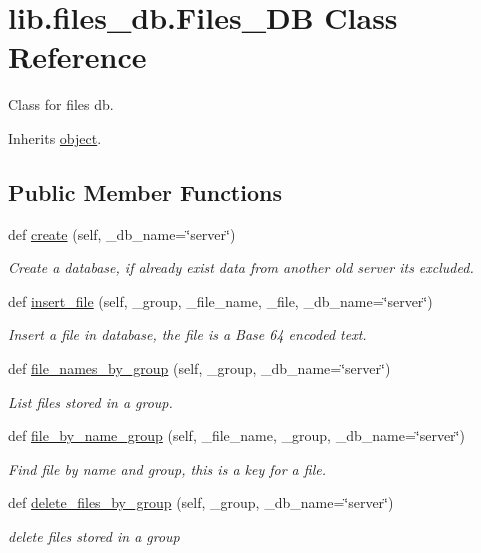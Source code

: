 \hypertarget{classlib_1_1files__db_1_1_files___d_b}{}\section{lib.\+files\+\_\+db.\+Files\+\_\+\+DB Class Reference}
\label{classlib_1_1files__db_1_1_files___d_b}


Class for files db.  




Inherits \hyperlink{classobject}{object}.

\subsection*{Public Member Functions}
\begin{DoxyCompactItemize}
\item 
def \hyperlink{classlib_1_1files__db_1_1_files___d_b_a2ed93dcb4dac5e59389ee16c1c8e5ebb}{create} (self, \+\_\+db\+\_\+name=\char`\"{}server\char`\"{})
\begin{DoxyCompactList}\small\item\em Create a database, if already exist data from another old server it\textquotesingle{}s excluded. \end{DoxyCompactList}\item 
def \hyperlink{classlib_1_1files__db_1_1_files___d_b_ac61ae182f614bd984fd1c467c09ef1b6}{insert\+\_\+file} (self, \+\_\+group, \+\_\+file\+\_\+name, \+\_\+file, \+\_\+db\+\_\+name=\char`\"{}server\char`\"{})
\begin{DoxyCompactList}\small\item\em Insert a file in database, the file is a Base 64 encoded text. \end{DoxyCompactList}\item 
def \hyperlink{classlib_1_1files__db_1_1_files___d_b_a8e3fdddca49d9b01d948e5d396807a81}{file\+\_\+names\+\_\+by\+\_\+group} (self, \+\_\+group, \+\_\+db\+\_\+name=\char`\"{}server\char`\"{})
\begin{DoxyCompactList}\small\item\em List files stored in a group. \end{DoxyCompactList}\item 
def \hyperlink{classlib_1_1files__db_1_1_files___d_b_ab0b2895285693e07eed34fb5b4eaebc8}{file\+\_\+by\+\_\+name\+\_\+group} (self, \+\_\+file\+\_\+name, \+\_\+group, \+\_\+db\+\_\+name=\char`\"{}server\char`\"{})
\begin{DoxyCompactList}\small\item\em Find file by name and group, this is a key for a file. \end{DoxyCompactList}\item 
def \hyperlink{classlib_1_1files__db_1_1_files___d_b_a614f96a2b2ce4e81bcd9fd48d979ff83}{delete\+\_\+files\+\_\+by\+\_\+group} (self, \+\_\+group, \+\_\+db\+\_\+name=\char`\"{}server\char`\"{})
\begin{DoxyCompactList}\small\item\em delete files stored in a group \end{DoxyCompactList}\end{DoxyCompactItemize}


